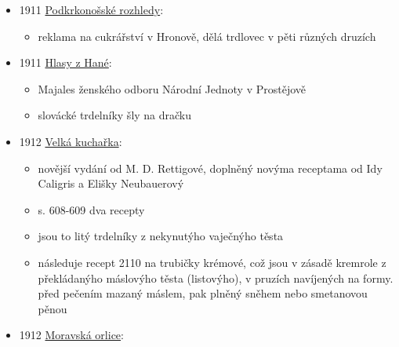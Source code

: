 \begin{itemize}
  \begin{itemize}
  \tightlist
  \item
    článek Besídka, položili základní kámen Uměleckého domu v Hodoníně,
    pak jeli do Bojanovic
  \item
    jedí na rožni pečený trdelníky
  \end{itemize}
\item
  1911
  \href{https://ceskadigitalniknihovna.cz/view/uuid:5a976b57-57a4-491f-b403-535f71c739a6?page=uuid\%3A2ec0de06-85d4-11e4-8faf-00155d010f03&fulltext=trdlovec&source=svkhk}{Podkrkonošské
  rozhledy}:

  \begin{itemize}
  \tightlist
  \item
    reklama na cukrářství v Hronově, dělá trdlovec v pěti různých
    druzích
  \end{itemize}
\item
  1911
  \href{https://www.digitalniknihovna.cz/vkol/uuid/uuid:d4380ff6-8a62-49b7-8196-d84c1ad69a53}{Hlasy
  z Hané}:

  \begin{itemize}
  \tightlist
  \item
    Majales ženského odboru Národní Jednoty v Prostějově
  \item
    slovácké trdelníky šly na dračku
  \end{itemize}
\item
  1912
  \href{https://ndk.cz/view/uuid:e8f12a30-1b67-11e7-96ce-005056827e51?page=uuid\%3Af8cffa60-2933-11e7-a38c-005056827e51}{Velká
  kuchařka}:

  \begin{itemize}
  \tightlist
  \item
    novější vydání od M. D. Rettigové, doplněný novýma receptama od Idy
    Caligris a Elišky Neubauerový
  \item
    s. 608-609 dva recepty
  \item
    jsou to litý trdelníky z nekynutýho vaječnýho těsta
  \item
    následuje recept 2110 na trubičky krémové, což jsou v zásadě
    kremrole z překládanýho máslovýho těsta (listovýho), v pruzích
    navíjených na formy. před pečením mazaný máslem, pak plněný sněhem
    nebo smetanovou pěnou
  \end{itemize}
\item
  1912
  \href{https://ceskadigitalniknihovna.cz/view/uuid:2c2f1570-b8b8-11de-b399-000d606f5dc6?page=uuid:625e3e20-b7e9-11de-8b7d-000d606f5dc6&source=mzk}{Moravská
  orlice}:


\end{itemize}
